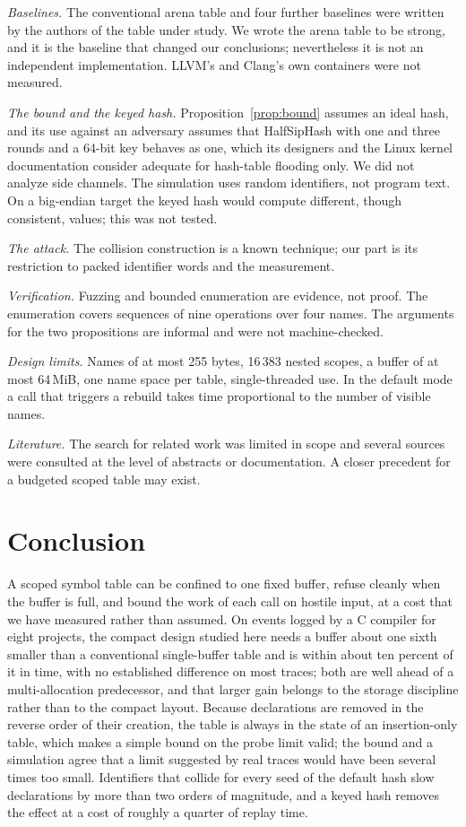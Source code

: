 \emph{Baselines.} The conventional arena table and four further baselines were written by the authors of the table under study. We wrote the arena table to be strong, and it is the baseline that changed our conclusions; nevertheless it is not an independent implementation. LLVM's and Clang's own containers were not measured.

\emph{The bound and the keyed hash.} Proposition~\ref{prop:bound} assumes an ideal hash, and its use against an adversary assumes that HalfSipHash with one and three rounds and a 64-bit key behaves as one, which its designers and the Linux kernel documentation consider adequate for hash-table flooding only. We did not analyze side channels. The simulation uses random identifiers, not program text. On a big-endian target the keyed hash would compute different, though consistent, values; this was not tested.

\emph{The attack.} The collision construction is a known technique; our part is its restriction to packed identifier words and the measurement.

\emph{Verification.} Fuzzing and bounded enumeration are evidence, not proof. The enumeration covers sequences of nine operations over four names. The arguments for the two propositions are informal and were not machine-checked.

\emph{Design limits.} Names of at most 255 bytes, 16\,383 nested scopes, a buffer of at most 64\,MiB, one name space per table, single-threaded use. In the default mode a call that triggers a rebuild takes time proportional to the number of visible names.

\emph{Literature.} The search for related work was limited in scope and several sources were consulted at the level of abstracts or documentation. A closer precedent for a budgeted scoped table may exist.

\section{Conclusion}
\label{sec:conclusion}
A scoped symbol table can be confined to one fixed buffer, refuse cleanly when the buffer is full, and bound the work of each call on hostile input, at a cost that we have measured rather than assumed. On events logged by a C compiler for eight projects, the compact design studied here needs a buffer about one sixth smaller than a conventional single-buffer table and is within about ten percent of it in time, with no established difference on most traces; both are well ahead of a multi-allocation predecessor, and that larger gain belongs to the storage discipline rather than to the compact layout. Because declarations are removed in the reverse order of their creation, the table is always in the state of an insertion-only table, which makes a simple bound on the probe limit valid; the bound and a simulation agree that a limit suggested by real traces would have been several times too small. Identifiers that collide for every seed of the default hash slow declarations by more than two orders of magnitude, and a keyed hash removes the effect at a cost of roughly a quarter of replay time.

